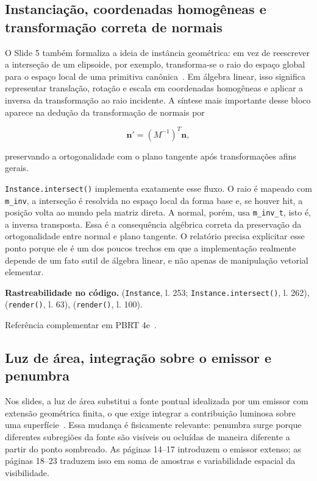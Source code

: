 \documentclass[portuguese]{sbcreviews-2025}%
\newcommand{\slidescite}[2]{\citep[pp.~#2]{#1}}
\newcommand{\pbrtsec}[1]{PBRT 4e~\citep[Se\c{c}\~ao~#1]{pharr2023pbrt}}
\begin{document}
\subsection{Instanciação, coordenadas homogêneas e transformação correta de normais}
\label{sec:slide5-instanciacao}

O Slide 5 também formaliza a ideia de instância geométrica: em vez de reescrever a interseção de um elipsoide, por exemplo, transforma-se o raio do espaço global para o espaço local de uma primitiva canônica~\slidescite{inf2608slides05}{9--13}. Em álgebra linear, isso significa representar translação, rotação e escala em coordenadas homogêneas e aplicar a inversa da transformação ao raio incidente. A síntese mais importante desse bloco aparece na dedução da transformação de normais por

\[
\mathbf{n}' = (M^{-1})^{T}\mathbf{n},
\]

preservando a ortogonalidade com o plano tangente após transformações afins gerais.

\texttt{Instance.intersect()} implementa exatamente esse fluxo. O raio é mapeado com \texttt{m\_inv}, a interseção é resolvida no espaço local da forma base e, se houver hit, a posição volta ao mundo pela matriz direta. A normal, porém, usa \texttt{m\_inv\_t}, isto é, a inversa transposta. Essa é a consequência algébrica correta da preservação da ortogonalidade entre normal e plano tangente. O relatório precisa explicitar esse ponto porque ele é um dos poucos trechos em que a implementação realmente depende de um fato sutil de álgebra linear, e não apenas de manipulação vetorial elementar.

\noindent\textbf{Rastreabilidade no código.}  (\texttt{Instance}, l. 253; \texttt{Instance.intersect()}, l. 262),  (\texttt{render()}, l. 63),  (\texttt{render()}, l. 100).

Referência complementar em \pbrtsec{3.5}.

\subsection{Luz de área, integração sobre o emissor e penumbra}
\label{sec:slide5-arealight}

Nos slides, a luz de área substitui a fonte pontual idealizada por um emissor com extensão geométrica finita, o que exige integrar a contribuição luminosa sobre uma superfície~\slidescite{inf2608slides05}{14--23}. Essa mudança é fisicamente relevante: penumbra surge porque diferentes subregiões da fonte são visíveis ou ocluídas de maneira diferente a partir do ponto sombreado. As páginas 14--17 introduzem o emissor extenso; as páginas 18--23 traduzem isso em soma de amostras e variabilidade espacial da visibilidade.
\end{document}
